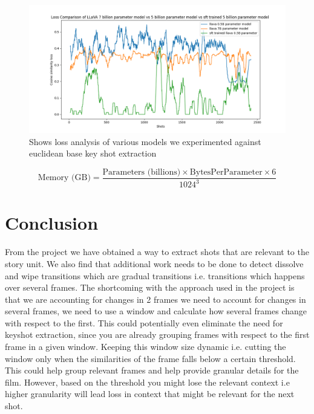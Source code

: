 \documentclass[12pt]{report}
\begin{document}
	
	\begin{figure}[h]  %
		\centering
		\includegraphics[width=\linewidth]{loss_analysis.png}  %
		\caption{Shows loss analysis of various models we experimented against euclidean base key shot extraction}
		\label{fig:loss_analysis}
	\end{figure}
	
	\begin{equation}
		\label{eq:memory_calculation}
		\text{Memory (GB)} = \frac{\text{Parameters (billions)} \times \text{BytesPerParameter} \times 6}{1024^3}
	\end{equation}
	
	\newpage
	\chapter{Conclusion}
	From the project we have obtained a way to extract shots that are relevant to the story unit. We also find that additional work needs to be done to detect dissolve and wipe transitions which are gradual transitions i.e. transitions which happens over several frames. The shortcoming with the approach used in the project is that we are accounting for changes in 2 frames we need to account for changes in several frames, we need to use a window and calculate how several frames change with respect to the first. This could potentially even eliminate the need for keyshot extraction, since you are already grouping frames with respect to the first frame in a given window. Keeping this window size dynamic i.e. cutting the window only when the similarities of the frame falls below a certain threshold. This could help group relevant frames and help provide granular details for the film. However, based on the threshold you might lose the relevant context i.e higher granularity will lead loss in context that might be relevant for the next shot.
	
\end{document}
